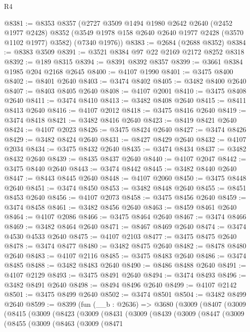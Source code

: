 \begin{lexlean}{R4}
\begin{coremodule}
@8381 := @8353
    @8357
    (@2727
      @3509
      @1494
      @1980
      @2642
      @2640
      (@2452 @1977 @2428)
      @8352
      (@3549 @1978 @158 @2640 @2640 @1977 @2428 (@3570 @1102 @1977) @3582)
      (@7340 @1976))
@8383 := @2684 (@2688 @8352)
@8384 := @8383 @3509
@8391 := @3521 @8384 @97 @22 @2169 @2172 @8252 @8318
@8392 := @189 @8315
@8394 := @8391 @8392 @8357
@8399 := @3661 @8384 @1985 @204 @2168 @2645
@8400 := @4107 @1990
@8401 := @3475 @8400
@8402 := @8401 @2640
@8403 := @3474 @8402
@8405 := @3482 @8400 @2640
@8407 := @8403 @8405 @2640
@8408 := @4107 @2001
@8410 := @3475 @8408 @2640
@8411 := @3474 @8410
@8413 := @3482 @8408 @2640
@8415 := @8411 @8413 @2640
@8416 := @4107 @2012
@8418 := @3475 @8416 @2640
@8419 := @3474 @8418
@8421 := @3482 @8416 @2640
@8423 := @8419 @8421 @2640
@8424 := @4107 @2023
@8426 := @3475 @8424 @2640
@8427 := @3474 @8426
@8429 := @3482 @8424 @2640
@8431 := @8427 @8429 @2640
@8432 := @4107 @2034
@8434 := @3475 @8432 @2640
@8435 := @3474 @8434
@8437 := @3482 @8432 @2640
@8439 := @8435 @8437 @2640
@8440 := @4107 @2047
@8442 := @3475 @8440 @2640
@8443 := @3474 @8442
@8445 := @3482 @8440 @2640
@8447 := @8443 @8445 @2640
@8448 := @4107 @2060
@8450 := @3475 @8448 @2640
@8451 := @3474 @8450
@8453 := @3482 @8448 @2640
@8455 := @8451 @8453 @2640
@8456 := @4107 @2073
@8458 := @3475 @8456 @2640
@8459 := @3474 @8458
@8461 := @3482 @8456 @2640
@8463 := @8459 @8461 @2640
@8464 := @4107 @2086
@8466 := @3475 @8464 @2640
@8467 := @3474 @8466
@8469 := @3482 @8464 @2640
@8471 := @8467 @8469 @2640
@8474 := @3474 @4530 @4533 @2640
@8475 := @4107 @2103
@8477 := @3475 @8475 @2640
@8478 := @3474 @8477
@8480 := @3482 @8475 @2640
@8482 := @8478 @8480 @2640
@8483 := @4107 @2116
@8485 := @3475 @8483 @2640
@8486 := @3474 @8485
@8488 := @3482 @8483 @2640
@8490 := @8486 @8488 @2640
@8491 := @4107 @2129
@8493 := @3475 @8491 @2640
@8494 := @3474 @8493
@8496 := @3482 @8491 @2640
@8498 := @8494 @8496 @2640
@8499 := @4107 @2142
@8501 := @3475 @8499 @2640
@8502 := @3474 @8501
@8504 := @3482 @8499 @2640
@8599 := @8399
    (fun (__b : @2636) =>
    @3680
      (@3009
        (@8407
          (@3009
            (@8415
              (@3009
                (@8423
                  (@3009
                    (@8431
                      (@3009
                        (@8439
                          (@3009
                            (@8447
                              (@3009
                                (@8455
                                  (@3009
                                    (@8463
                                      (@3009
                                        (@8471

\end{coremodule}
\end{lexlean}
